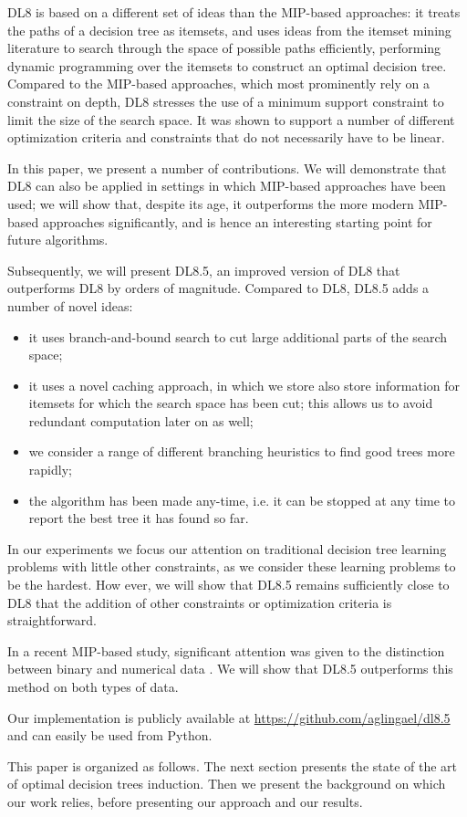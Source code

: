 DL8 is based on a different set of ideas than the MIP-based approaches: it treats the paths of a decision tree as itemsets, and uses ideas from the itemset mining literature \cite{agrawal:1996quest} to search through the space of possible paths efficiently, performing dynamic programming over the itemsets to construct an optimal decision tree. Compared to the MIP-based approaches, which most prominently rely on a constraint on depth, DL8 stresses the use of a minimum support constraint to limit the size of the search space. It was shown to support a number of different optimization criteria and constraints that do not necessarily have to be linear.

In this paper, we present a number of contributions. We will demonstrate that DL8 can also be applied in settings in which MIP-based approaches have been used; we will show that, despite its age, it outperforms the more modern MIP-based approaches significantly, and is hence an interesting starting point for future algorithms.

Subsequently, we will present DL8.5, an improved version of DL8 that outperforms DL8 by orders of magnitude. Compared to DL8, DL8.5 adds a number of novel ideas:

\begin{itemize}
	\item it uses branch-and-bound search to cut large additional parts of the search space;
	\item it uses a novel caching approach, in which we store also store information for itemsets for which the search space has been cut; this allows us to avoid redundant computation later on as well;
	\item we consider a range of different branching heuristics to find good trees more rapidly;
	\item the algorithm has been made any-time, i.e. it can be stopped at any time to report the best tree it has found so far.
\end{itemize}

In our experiments we focus our attention on traditional decision tree learning problems with little other constraints, as we consider these learning problems to be the hardest. How ever, we will show that DL8.5 remains sufficiently close to DL8 that the addition of other constraints or optimization criteria is straightforward.

In a recent MIP-based study, significant attention was given to the distinction between binary and numerical data \cite{verwer:2019learning}. We will show that DL8.5 outperforms this method on both types of data.

Our implementation is publicly available at \url{https://github.com/aglingael/dl8.5} and can easily be used from Python.

This paper is organized as follows. The next section presents the state of the art of optimal decision trees induction. Then we present the background on which our work relies, before presenting our approach and our results.